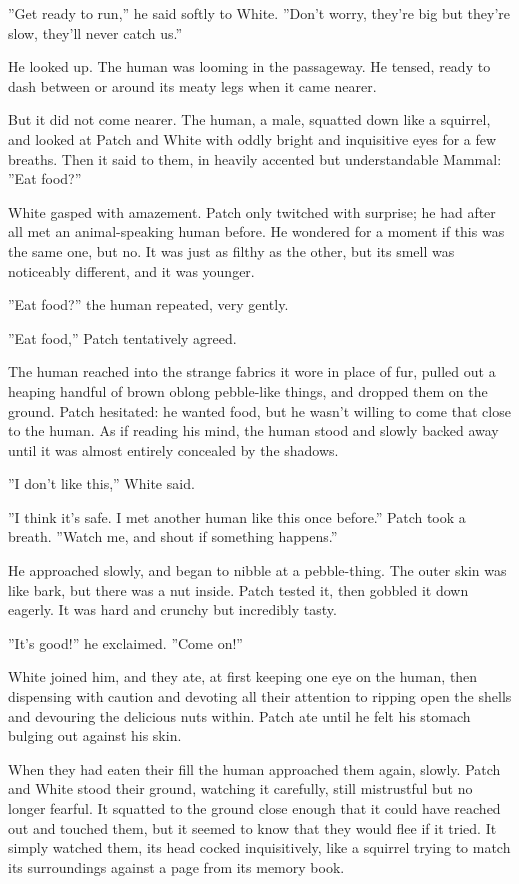 \documentclass[12pt]{book}
\begin{document}
 ''Get ready to run,'' he said softly to White. ''Don't worry, they're big but they're slow, they'll never catch us.''\par
 He looked up. The human was looming in the passageway. He tensed, ready to dash between or around its meaty legs when it came nearer.\par
 But it did not come nearer. The human, a male, squatted down like a squirrel, and looked at Patch and White with oddly bright and inquisitive eyes for a few breaths. Then it said to them, in heavily accented but understandable Mammal: ''Eat food?''\par
 White gasped with amazement. Patch only twitched with surprise; he had after all met an animal-speaking human before. He wondered for a moment if this was the same one, but no. It was just as filthy as the other, but its smell was noticeably different, and it was younger.\par
 ''Eat food?'' the human repeated, very gently.\par
 ''Eat food,'' Patch tentatively agreed.\par
 The human reached into the strange fabrics it wore in place of fur, pulled out a heaping handful of brown oblong pebble-like things, and dropped them on the ground. Patch hesitated: he wanted food, but he wasn't willing to come that close to the human. As if reading his mind, the human stood and slowly backed away until it was almost entirely concealed by the shadows.\par
 ''I don't like this,'' White said.\par
 ''I think it's safe. I met another human like this once before.'' Patch took a breath. ''Watch me, and shout if something happens.''\par
 He approached slowly, and began to nibble at a pebble-thing. The outer skin was like bark, but there was a nut inside. Patch tested it, then gobbled it down eagerly. It was hard and crunchy but incredibly tasty.\par
 ''It's good!'' he exclaimed. ''Come on!''\par
 White joined him, and they ate, at first keeping one eye on the human, then dispensing with caution and devoting all their attention to ripping open the shells and devouring the delicious nuts within. Patch ate until he felt his stomach bulging out against his skin.\par
 When they had eaten their fill the human approached them again, slowly. Patch and White stood their ground, watching it carefully, still mistrustful but no longer fearful. It squatted to the ground close enough that it could have reached out and touched them, but it seemed to know that they would flee if it tried. It simply watched them, its head cocked inquisitively, like a squirrel trying to match its surroundings against a page from its memory book.\par
\end{document}
